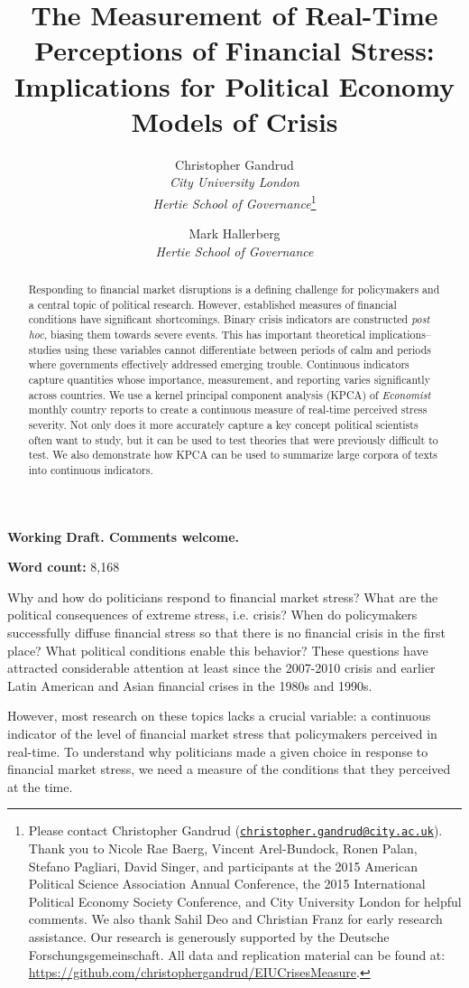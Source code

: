 \documentclass[]{article}
\title{The Measurement of Real-Time Perceptions of Financial Stress: Implications for Political Economy Models of Crisis}
\author{Christopher Gandrud \\ \emph{City University London} \\ \emph{Hertie School of Governance}\footnote{Please contact Christopher Gandrud
(\href{mailto:christopher.gandrud@city.ac.uk}{\nolinkurl{christopher.gandrud@city.ac.uk}}).
Thank you to Nicole Rae Baerg, Vincent Arel-Bundock, Ronen Palan, Stefano Pagliari, David Singer, and participants at the 2015 American Political Science Association Annual Conference, the 2015 International Political Economy Society Conference, and City University London for helpful comments. We also thank Sahil Deo and Christian Franz for early research assistance. Our research is generously supported by the Deutsche Forschungsgemeinschaft. All data and replication material can be found at:
\url{https://github.com/christophergandrud/EIUCrisesMeasure}.}
\and
Mark Hallerberg \\ \emph{Hertie School of Governance}}
\begin{document}
\maketitle

\begin{center}
    \textbf{Working Draft. Comments welcome.}
\end{center}


\begin{abstract}

Responding to financial market disruptions is a defining challenge for policymakers and a central topic of political research. However, established measures of financial conditions have significant shortcomings. Binary crisis indicators \cite[e.g.][]{laeven2013} are constructed \emph{post hoc}, biasing them towards severe events. This has important theoretical implications--studies using these variables cannot differentiate between periods of calm and periods where governments effectively addressed emerging trouble. Continuous indicators capture quantities whose importance, measurement, and reporting varies significantly across countries. We use a kernel principal component analysis (KPCA) of \emph{Economist} monthly country reports to create a continuous measure of real-time perceived stress severity. Not only does it more accurately capture a key concept political scientists often want to study, but it can be used to test theories that were previously difficult to test. We also demonstrate how KPCA can be used to summarize large corpora of texts into continuous indicators.

\end{abstract}


\textbf{Word count:} 8,168

\clearpage

Why and how do politicians respond to financial market stress? What are the political consequences of extreme stress, i.e. crisis? When do policymakers successfully diffuse financial stress so that there is no financial crisis in the first place? What political conditions enable this behavior? These questions have attracted considerable attention at least since the 2007-2010 crisis and earlier Latin American and Asian financial crises in the 1980s and 1990s.

However, most research on these topics lacks a crucial variable: a continuous indicator of the level of financial market stress that policymakers perceived in real-time. To understand why politicians made a given choice in response to financial market stress, we need a measure of the conditions that they perceived at the time.
\end{document}
